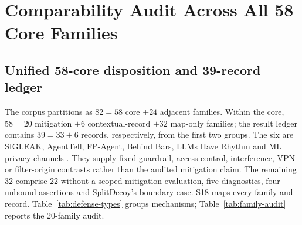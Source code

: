 \section{Comparability Audit Across All 58 Core Families}\label{sec:defenses}
\subsection{Unified 58-core disposition and 39-record ledger}
The corpus partitions as $82=58$ core $+24$ adjacent families. Within the core, $58=20$ mitigation $+6$ contextual-record $+32$ map-only families; the result ledger contains $39=33+6$ records, respectively, from the first two groups. The six are SIGLEAK, AgentTell, FP-Agent, Behind Bars, LLMs Have Rhythm and ML privacy channels \cite{geng2026sigleak,shahriar2026agenttell,wang2026fpagent,gu2026behindbars,alhazbi2025rhythm,debenedetti2024privacy}. They supply fixed-guardrail, access-control, interference, VPN or filter-origin contrasts rather than the audited mitigation claim. The remaining 32 comprise 22 without a scoped mitigation evaluation, five diagnostics, four unbound assertions and SplitDecoy's boundary case. S18 maps every family and record. Table~\ref{tab:defense-types} groups mechanisms; Table~\ref{tab:family-audit} reports the 20-family audit.


